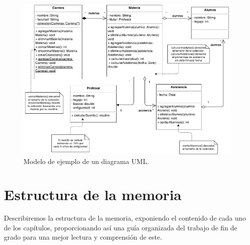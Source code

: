 \documentclass[a4paper, 12pt]{book}
\begin{document}
\begin{figure}
  \centering
  \includegraphics[width=16cm, keepaspectratio]{img/Diagrama-uml.png}
  \caption{Modelo de ejemplo de un diagrama UML.}\label{fig:diagrama-uml}
\end{figure}



\section{Estructura de la memoria}
\label{sec:estructura}

Describiremos la estructura de la memoria, exponiendo el contenido de cada uno de los capítulos, proporcionando así una guía organizada del trabajo de fin de grado para una mejor lectura y comprensión de este.
\end{document}

